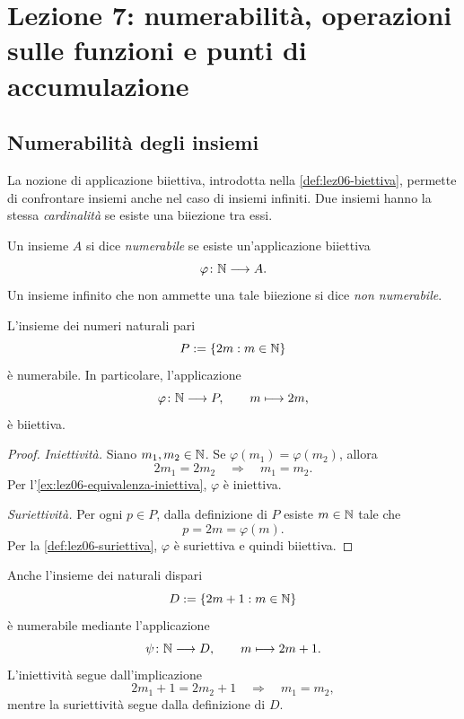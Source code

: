 \chapter[Lezione 7 --- 14 ottobre 2026]{Lezione 7: numerabilità, operazioni sulle funzioni e punti di accumulazione}
\label{chap:lezione-07}

\section{Numerabilità degli insiemi}
\label{sec:lez07-numerabilita}

La nozione di applicazione biiettiva, introdotta nella
\cref{def:lez06-biettiva}, permette di confrontare insiemi
anche nel caso di insiemi infiniti. Due insiemi
hanno la stessa \emph{cardinalità} se esiste una biiezione
tra essi.

\begin{definition}
\label{def:lez07-numerabilita}
Un insieme \(A\) si dice \emph{numerabile} se esiste
un'applicazione biiettiva
\[
  \varphi\colon\mathbb{N}\longrightarrow A.
\]
Un insieme infinito che non ammette una tale biiezione
si dice \emph{non numerabile}.
\end{definition}

\begin{proposition}
\label{prop:lez07-pari}
L'insieme dei numeri naturali pari
\[
  P:=\{2m:m\in\mathbb{N}\}
\]
è numerabile. In particolare, l'applicazione
\[
  \varphi\colon\mathbb{N}\longrightarrow P,
  \qquad m\longmapsto 2m,
\]
è biiettiva.
\end{proposition}

\begin{proof}
\emph{Iniettività.}
Siano \(m_1,m_2\in\mathbb{N}\). Se \(\varphi(m_1)=\varphi(m_2)\), allora
\[
  2m_1=2m_2
  \quad\Longrightarrow\quad
  m_1=m_2.
\]
Per l'\cref{ex:lez06-equivalenza-iniettiva},
\(\varphi\) è iniettiva.

\emph{Suriettività.}
Per ogni \(p\in P\), dalla definizione di \(P\)
esiste \(m\in\mathbb{N}\) tale che
\[
  p=2m=\varphi(m).
\]
Per la \cref{def:lez06-suriettiva}, \(\varphi\)
è suriettiva e quindi biiettiva.
\end{proof}

Anche l'insieme dei naturali dispari
\[
  D:=\{2m+1:m\in\mathbb{N}\}
\]
è numerabile mediante l'applicazione
\[
  \psi\colon\mathbb{N}\longrightarrow D,
  \qquad m\longmapsto 2m+1.
\]
L'iniettività segue dall'implicazione
\[
  2m_1+1=2m_2+1
  \quad\Longrightarrow\quad
  m_1=m_2,
\]
mentre la suriettività segue dalla definizione di \(D\).

